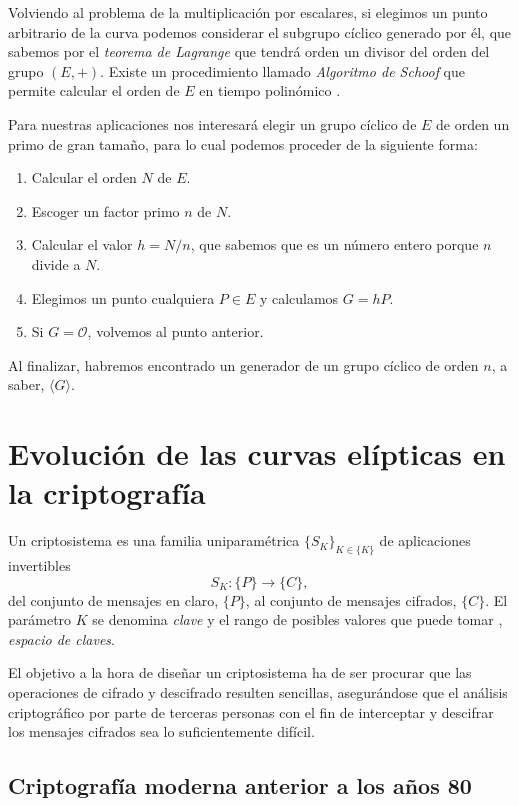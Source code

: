 \documentclass[
  a4paper,
  12pt,
  spanish,
]{scrartcl}
\begin{document}
Volviendo al problema de la multiplicación por escalares, si elegimos un punto arbitrario de la curva podemos considerar el subgrupo cíclico generado por él, que sabemos por el \textit{teorema de Lagrange} que tendrá orden un divisor del orden del grupo $(E, +)$. Existe un procedimiento llamado \textit{Algoritmo de Schoof} que permite calcular el orden de $E$ en tiempo polinómico \parencite{schoof_points_1995}.

Para nuestras aplicaciones nos interesará elegir un grupo cíclico de $E$ de orden un primo de gran tamaño, para lo cual podemos proceder de la siguiente forma:

\begin{enumerate}
	\item Calcular el orden $N$ de $E$.
	\item Escoger un factor primo $n$ de $N$.
	\item Calcular el valor $h = N/n$, que sabemos que es un número entero porque $n$ divide a $N$.
	\item Elegimos un punto cualquiera $P \in E$ y calculamos $G = hP$.
	\item Si $G=\mathcal{O}$, volvemos al punto anterior.
\end{enumerate}

Al finalizar, habremos encontrado un generador de un grupo cíclico de orden $n$, a saber, $\langle G \rangle$.

\section{Evolución de las curvas elípticas en la criptografía}

Un criptosistema es una familia uniparamétrica \(\{S_K\}_{K \in \{K\}}\) de aplicaciones invertibles \[S_K: \{P\} \to \{C\},\] del conjunto de mensajes en claro, \(\{P\}\), al conjunto de mensajes cifrados, \(\{C\}\). 
El parámetro \(K\) se denomina \textit{clave} y el rango de posibles valores que puede tomar 
, \textit{espacio de claves}.

El objetivo a la hora de diseñar un criptosistema 
 ha de ser procurar que las operaciones de cifrado y descifrado resulten sencillas, asegurándose que el análisis criptográfico por parte de terceras personas con el fin de interceptar y descifrar los mensajes cifrados sea lo suficientemente difícil.

\subsection{Criptografía moderna anterior a los años 80}
\end{document}
